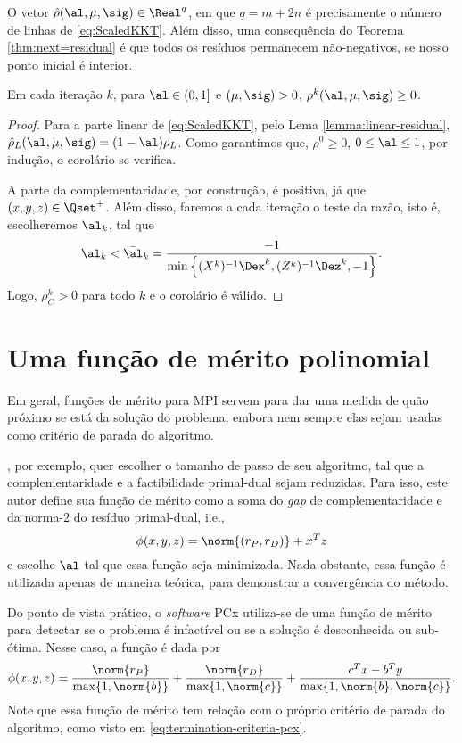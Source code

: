 O vetor  $\hat{\rho}(\al,\mu,\sig) \in \Real^q$, em que  $q = m+2n$ é
precisamente o número de linhas de  \eqref{eq:ScaledKKT}. Além disso, uma
consequência do Teorema \ref{thm:next=residual} é que todos os resíduos
permanecem não-negativos, se nosso ponto inicial é interior. 

\begin{corol}\label{cor:positive-residual}
Em cada iteração $k$, para  $ \al \in(0,1]$ e  $(\mu, \sig)>0$,
$\rho^k(\al,\mu,\sig) \geq 0$.
\end{corol} 
\begin{proof}

Para a parte linear de  \eqref{eq:ScaledKKT}, pelo Lema
\ref{lemma:linear-residual}, $\hat{\rho}_L(\al,\mu,\sig) = (1-\al)\rho_L$. Como
garantimos que, $\rho^0\geq 0$, $0\leq\al\leq1 $, por  indução, o corolário
se verifica.

A parte da complementaridade, por construção,  é positiva, já que 
$(x,y,z)\in\Qset^+$. Além disso, faremos a cada iteração o teste da razão, isto é, escolheremos $\al_k$,
tal que \[ \al_k < \bar{\al}_k = \frac{-1}{\min\left\{
(X^k)^{-1}\Dex^k,(Z^k)^{-1}\Dez^k,-1 \right\}}. \]
Logo, $\rho^k_C>0$ para todo $k$ e o corolário é válido. 
\end{proof}

\section{Uma função de mérito polinomial}


Em geral, funções de mérito para \ac{MPI} servem para dar uma medida de quão
próximo se está da solução do problema, embora nem sempre elas sejam usadas como
critério de parada do algoritmo. 

\textcite{Zhang:2006ic}, por exemplo, quer escolher o tamanho de passo de seu
algoritmo, tal que a  complementaridade e a factibilidade primal-dual sejam
reduzidas. Para isso, este autor define sua função de mérito como a soma do
\emph{gap} de complementaridade e da norma-2 do resíduo primal-dual, i.e., \[\phi(x,y,z) =
\norm{(r_P,r_D)} + x^Tz\] e escolhe $\al$ tal que essa função seja minimizada.
Nada obstante, essa função é utilizada apenas de maneira teórica, para
demonstrar a convergência do método.

Do ponto de vista prático, o \emph{software} PCx \cite{Czyzyk:1999hk} utiliza-se de
uma função de mérito para detectar se o problema é infactível ou se a solução é desconhecida
ou sub-ótima. Nesse caso, a função é dada por 
\[
\phi(x,y,z) = \frac{\norm{r_P}}{\max \{1,\norm{b} \} } + \frac{\norm{r_D}}{\max
\{1,\norm{c} \} } + \frac{c^Tx - b^Ty}{\max \{1,\norm{b},\norm{c} \} }.
\]
Note que essa função de mérito tem relação com o próprio critério de parada
do algoritmo, como visto em  \eqref{eq:termination-criteria-pcx}.


